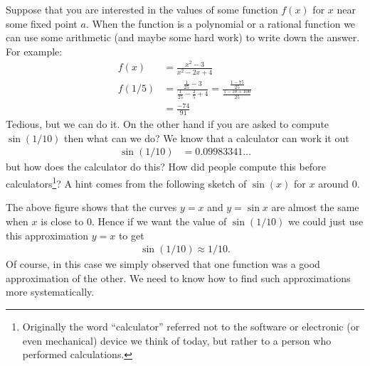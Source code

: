 \label{sec:DIFFTaylor}
Suppose that you are interested in the values of some function $f(x)$ for
$x$ near some fixed point $a$. When the function is a polynomial or a rational
function we can use some arithmetic (and maybe some hard work) to write down
the answer. For example:
\begin{align*}
  f(x) &= \frac{x^2-3}{x^2-2x+4} \\
  f(1/5) &= \frac{ \frac{1}{25}-3}{\frac{1}{25}-\frac{2}{5}+4 }
  = \frac{\frac{1-75}{25} }{\frac{1-10+100}{25}}\\
  &= \frac{-74}{91}
\end{align*}
Tedious, but we can do it. On the other hand if you are asked to compute
$\sin(1/10)$ then what can we do? We know that a calculator can work it out
\begin{align*}
  \sin(1/10) &= 0.09983341\dots
\end{align*}
but how does the calculator do this? How did people compute this before
calculators\footnote{Originally the word ``calculator'' referred not to the
software or electronic (or even mechanical) device we think of today, but
rather to a person who performed calculations.}? A hint comes from the
following sketch of $\sin(x)$ for $x$ around $0$.

\begin{fig}
 \begin{center}
 \end{center}
\end{fig}
The above figure shows that the curves $y=x$ and $y=\sin x$ are almost the same
when $x$ is close to $0$. Hence if we want the value of
$\sin(1/10)$ we could just use this approximation $y=x$ to get
\begin{align*}
  \sin(1/10) \approx 1/10.
\end{align*}
Of course, in this case we simply observed that one function was a good
approximation of the other. We need to know how to find such approximations
more systematically.

